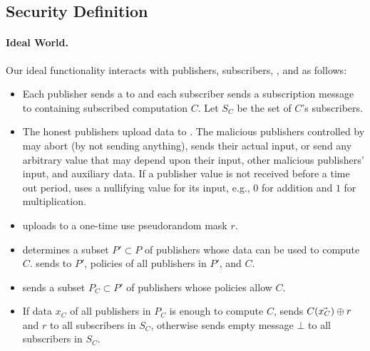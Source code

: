 \subsection{Security Definition}


\paragraph{Ideal World.}
Our ideal functionality \F interacts with publishers, subscribers, \broker, and
\garbler as follows:

\begin{itemize}[leftmargin=*]
		\item Each publisher sends a \policy to \F and each subscriber sends a
			subscription message to \F containing subscribed computation $C$. Let $S_C$
			be the set of $C$'s subscribers. 
			
		
		\item The honest publishers upload data to \F. The malicious publishers
			controlled by \Adv may abort (by not sending anything), sends their
			actual input, or send any arbitrary value that may depend upon their
			input, other malicious publishers' input, and auxiliary data. If a
			publisher value is not received before a time out period, \F uses a
			nullifying value for its input, e.g., $0$ for addition and $1$ for
			multiplication. 
		
		\item \garbler uploads to \F a one-time use pseudorandom mask $r$.

		\item \F determines a subset $P' \subset P$ of publishers whose data can be
			used to compute $C$. \F sends to \broker $P'$, policies of all publishers
			in $P'$, and $C$.

		\item \broker sends \F a subset $P_C \subset P'$ of publishers whose
			policies allow $C$.
			
		\item If data $x_C$ of all publishers in $P_C$ is enough to compute $C$, \F
			sends $C(\vec{x_C}) \oplus r$ and $r$ to all subscribers in $S_C$,
			otherwise \F sends empty message $\bot$ to all subscribers in $S_C$. 

\end{itemize}

